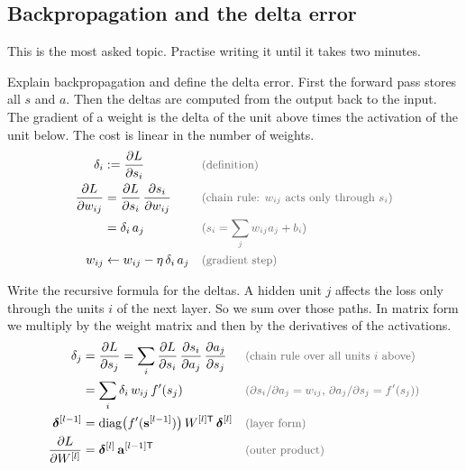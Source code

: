 \subsection{Backpropagation and the delta error}

This is the most asked topic. Practise writing it until it takes two minutes.

\begin{qabox}{Explain backpropagation and define the delta error.}
\explain First the forward pass stores all $s$ and $a$. Then the deltas are computed from the
output back to the input. The gradient of a weight is the delta of the unit above times the
activation of the unit below. The cost is linear in the number of weights.
\derive
\begin{align*}
\delta_i &:= \frac{\partial L}{\partial s_i} \why{definition} \\
\frac{\partial L}{\partial w_{ij}} &= \frac{\partial L}{\partial s_i}\,\frac{\partial s_i}{\partial w_{ij}} \why{chain rule: $w_{ij}$ acts only through $s_i$} \\
&= \delta_i\,a_j \why{$s_i = \sum_j w_{ij}a_j + b_i$} \\
w_{ij} &\leftarrow w_{ij} - \eta\,\delta_i\,a_j \why{gradient step}
\end{align*}
\end{qabox}

\begin{qabox}{Write the recursive formula for the deltas.}
\explain A hidden unit $j$ affects the loss only through the units $i$ of the next layer. So we sum
over those paths. In matrix form we multiply by the weight matrix and then by the derivatives of
the activations.
\derive
\begin{align*}
\delta_j &= \frac{\partial L}{\partial s_j} = \sum_i \frac{\partial L}{\partial s_i}\,\frac{\partial s_i}{\partial a_j}\,\frac{\partial a_j}{\partial s_j} \why{chain rule over all units $i$ above} \\
&= \sum_i \delta_i\,w_{ij}\,f'(s_j) \why{$\partial s_i/\partial a_j = w_{ij}$, $\partial a_j/\partial s_j = f'(s_j)$} \\
\bm{\delta}^{[l-1]} &= \mathrm{diag}\bigl(f'(\mathbf{s}^{[l-1]})\bigr)\,W^{[l]\mathsf{T}}\,\bm{\delta}^{[l]} \why{layer form} \\
\frac{\partial L}{\partial W^{[l]}} &= \bm{\delta}^{[l]}\,\mathbf{a}^{[l-1]\mathsf{T}} \why{outer product}
\end{align*}
\end{qabox}

